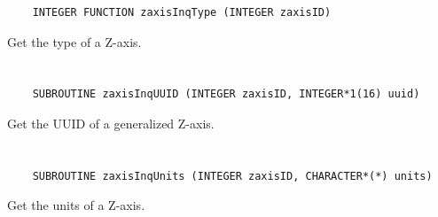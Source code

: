 \begin{verbatim}
    INTEGER FUNCTION zaxisInqType (INTEGER zaxisID)
\end{verbatim}

Get the type of a Z-axis.


\section*{\tt {}}

\begin{verbatim}
    SUBROUTINE zaxisInqUUID (INTEGER zaxisID, INTEGER*1(16) uuid)
\end{verbatim}

Get the UUID of a generalized Z-axis.


\section*{\tt {}}

\begin{verbatim}
    SUBROUTINE zaxisInqUnits (INTEGER zaxisID, CHARACTER*(*) units)
\end{verbatim}

Get the units of a Z-axis.


